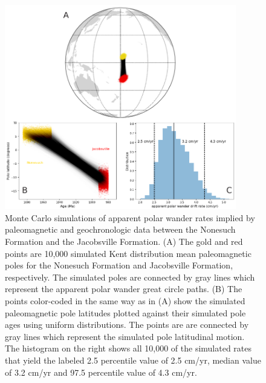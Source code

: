 \documentclass[11pt,letterpaper]{article}
\begin{document}
\begin{figure}[h!]
\centering
\includegraphics[width=0.9\textwidth]{Manuscript/SI_Jacobsville_Nonesuch_rate.pdf}
\caption{Monte Carlo simulations of apparent polar wander rates implied by paleomagnetic and geochronologic data between the Nonesuch Formation and the Jacobsville Formation. (A) The gold and red points are 10,000 simulated Kent distribution mean paleomagnetic poles for the Nonesuch Formation and Jacobsville Formation, respectively. The simulated poles are connected by gray lines which represent the apparent polar wander great circle paths. (B) The points color-coded in the same way as in (A) show the simulated paleomagnetic pole latitudes plotted against their simulated pole ages using uniform distributions. The points are are connected by gray lines which represent the simulated pole latitudinal motion. The histogram on the right shows all 10,000 of the simulated rates that yield the labeled 2.5 percentile value of 2.5 cm/yr, median value of 3.2 cm/yr and 97.5 percentile value of 4.3 cm/yr.}
\label{fig:Jacobsville_Nonesuch_rate}
\end{figure}
\end{document}
